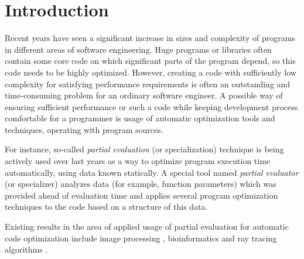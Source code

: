 \documentclass[conference]{IEEEtran}
\begin{document}
\section{Introduction}
Recent years have seen a significant increase in sizes and complexity of programs in different areas of software engineering. Huge programs or libraries often contain some core code on which significant parts of the program depend, so this code needs to be highly optimized. However, creating a code with sufficiently low complexity for satisfying performance requirements is often an outstanding and time-consuming problem for an ordinary software engineer. A possible way of ensuring sufficient performance or such a code while keeping development process comfortable for a programmer is usage of automatic optimization tools and techniques, operating with program sources.

For instance, so-called \textit{partial evaluation} (or specialization) \cite{jones1993partial} technique is being actively used over last years as a way to optimize program execution time automatically, using data known statically. A special tool named \textit{partial evaluator} (or specializer) analyzes data (for example, function parameters) which was provided ahead of evaluation time and applies several program optimization techniques to the code based on a structure of this data. 





Existing results in the area of applied usage of partial evaluation for automatic code optimization include image processing \cite{leissa2018anydsl}, bioinformatics \cite{muller2020anyseq} and ray tracing algorithms \cite{perard2019rodent}.
\end{document}
